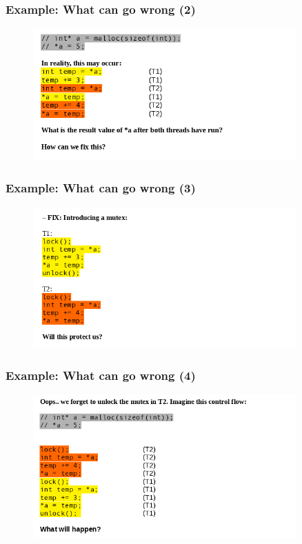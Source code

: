 \documentclass{beamer}
\begin{document}
\begin{frame}
\frametitle{Example: What can go wrong (2)}
\begin{figure}
\includegraphics[width=0.9\textwidth]{images/what-can-go-wrong-2.png}
\end{figure}
\end{frame}

\begin{frame}
\frametitle{Example: What can go wrong (3)}
\begin{figure}
\includegraphics[width=0.9\textwidth]{images/what-can-go-wrong-3.png}
\end{figure}
\end{frame}

\begin{frame}
\frametitle{Example: What can go wrong (4)}
\begin{figure}
\includegraphics[width=0.9\textwidth]{images/what-can-go-wrong-4.png}
\end{figure}
\end{frame}
\end{document}
